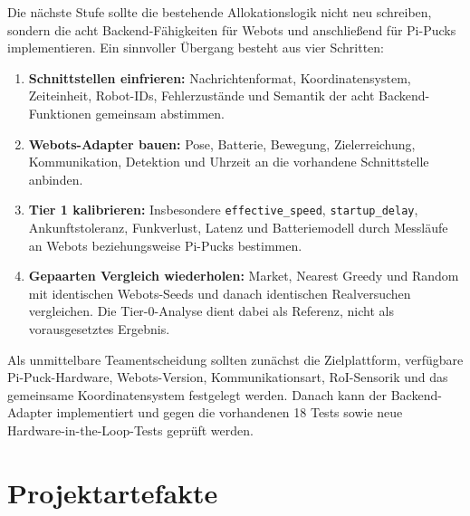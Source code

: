 \documentclass[11pt,a4paper]{article}
\begin{document}
Die nächste Stufe sollte die bestehende Allokationslogik nicht neu schreiben, sondern
die acht Backend-Fähigkeiten für Webots und anschließend für Pi-Pucks implementieren.
Ein sinnvoller Übergang besteht aus vier Schritten:

\begin{enumerate}
  \item \textbf{Schnittstellen einfrieren:} Nachrichtenformat, Koordinatensystem,
        Zeiteinheit, Robot-IDs, Fehlerzustände und Semantik der acht Backend-Funktionen
        gemeinsam abstimmen.
  \item \textbf{Webots-Adapter bauen:} Pose, Batterie, Bewegung, Zielerreichung,
        Kommunikation, Detektion und Uhrzeit an die vorhandene Schnittstelle anbinden.
  \item \textbf{Tier 1 kalibrieren:} Insbesondere \texttt{effective\_speed},
        \texttt{startup\_delay}, Ankunftstoleranz, Funkverlust, Latenz und Batteriemodell
        durch Messläufe an Webots beziehungsweise Pi-Pucks bestimmen.
  \item \textbf{Gepaarten Vergleich wiederholen:} Market, Nearest Greedy und Random mit
        identischen Webots-Seeds und danach identischen Realversuchen vergleichen. Die
        Tier-0-Analyse dient dabei als Referenz, nicht als vorausgesetztes Ergebnis.
\end{enumerate}

Als unmittelbare Teamentscheidung sollten zunächst die Zielplattform, verfügbare
Pi-Puck-Hardware, Webots-Version, Kommunikationsart, RoI-Sensorik und das gemeinsame
Koordinatensystem festgelegt werden. Danach kann der Backend-Adapter implementiert und
gegen die vorhandenen 18 Tests sowie neue Hardware-in-the-Loop-Tests geprüft werden.

\section{Projektartefakte}
\end{document}
